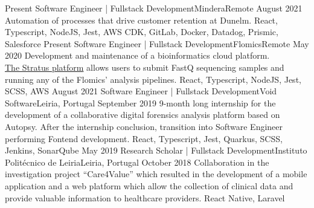 %
%
%
\begin{experiences}
  \experience
    {Present}   {Software Engineer | Fullstack Development}{Mindera}{Remote}
    {August 2021} {Automation of processes that drive customer retention at Dunelm.}
                  {React, Typescript, NodeJS, Jest, AWS CDK, GitLab, Docker, Datadog, Prismic, Salesforce}
  \emptySeparator
  \experience
    {Present} {Software Engineer | Fullstack Development}{Flomics}{Remote}
    {May 2020}    {Development and maintenance of a bioinformatics cloud platform.\\
                  \href{https://cloud.flomics.com}{The Stratus platform} allows users to submit FastQ sequencing samples and running any of the Flomics' analysis pipelines.}
                  {React, Typescript, NodeJS, Jest, SCSS, AWS}
  \emptySeparator
  \experience
    {August 2021}     {Software Engineer | Fullstack Development}{Void Software}{Leiria, Portugal}
    {September 2019}    {9-month long internship for the development of a collaborative digital forensics analysis
                          platform based on Autopsy.
                          After the internship conclusion, transition into Software Engineer
                          performing Fontend development.}
                  {React, Typescript, Jest, Quarkus, SCSS, Jenkins, SonarQube}
  \emptySeparator
  \emptySeparator
  \experience
    {May 2019}     {Research Scholar | Fullstack Development}{Instituto Politécnico de Leiria}{Leiria, Portugal}
    {October 2018}    {Collaboration in the investigation project “Care4Value” which resulted in
                        the development of a mobile application and a web platform which allow
                        the collection of clinical data and provide valuable information to
                        healthcare providers.}
                    {React Native, Laravel}
  \emptySeparator
\end{experiences}
